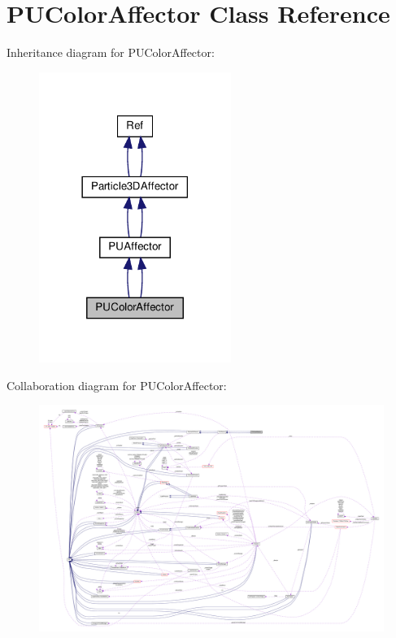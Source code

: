 \hypertarget{classPUColorAffector}{}\section{P\+U\+Color\+Affector Class Reference}
\label{classPUColorAffector}


Inheritance diagram for P\+U\+Color\+Affector\+:
\nopagebreak
\begin{figure}[H]
\begin{center}
\leavevmode
\includegraphics[width=177pt]{classPUColorAffector__inherit__graph}
\end{center}
\end{figure}


Collaboration diagram for P\+U\+Color\+Affector\+:
\nopagebreak
\begin{figure}[H]
\begin{center}
\leavevmode
\includegraphics[width=350pt]{classPUColorAffector__coll__graph}
\end{center}
\end{figure}
